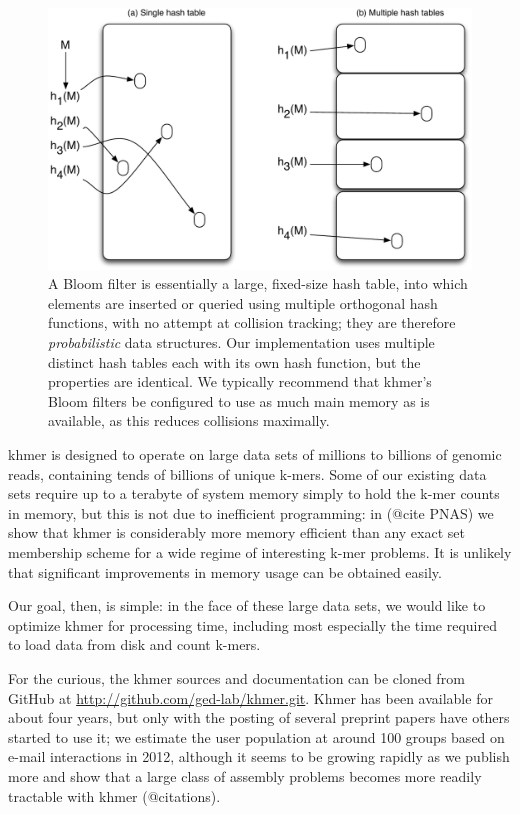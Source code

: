 \documentclass{article}
\begin{document}
\begin{figure}[ht!]
\centering
\includegraphics[scale=0.6]{bloomFilter.pdf}

\caption{A Bloom filter is essentially a large, fixed-size hash
  table, into which elements are inserted or queried using multiple
  orthogonal hash functions, with no attempt at collision tracking;
  they are therefore {\em probabilistic} data structures.  Our
  implementation uses multiple distinct hash tables each with its own
  hash function, but the properties are identical.  We typically
  recommend that khmer's Bloom filters be configured to use as much
  main memory as is available, as this reduces collisions maximally.}

\label{bloomFilter}
\end{figure}

khmer is designed to operate on large data sets of millions to billions of
genomic reads, containing tends of billions of unique k-mers.  Some of our
existing data sets require up to a terabyte of system memory simply to
hold the k-mer counts in memory, but this is not due to inefficient
programming: in (@cite PNAS) we show that khmer is considerably more
memory efficient than any exact set membership scheme for a wide regime
of interesting k-mer problems.  It is unlikely that significant improvements
in memory usage can be obtained easily.

Our goal, then, is simple: in the face of these large data sets, we
would like to optimize khmer for processing time, including most especially
the time required to load data from disk and count k-mers.

For the curious, the khmer sources and documentation can be cloned
from GitHub at \url{http://github.com/ged-lab/khmer.git}.  Khmer has
been available for about four years, but only with the posting of
several preprint papers have others started to use it; we estimate the
user population at around 100 groups based on e-mail interactions in
2012, although it seems to be growing rapidly as we publish more and
show that a large class of assembly problems becomes more readily
tractable with khmer (@citations).
\end{document}
